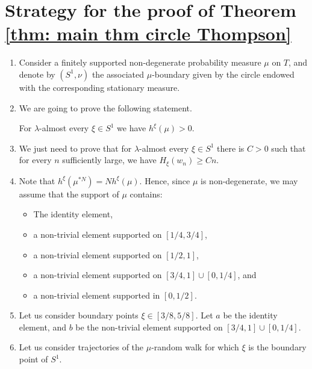 \section{Strategy for the proof of Theorem \ref{thm: main thm circle Thompson}}

\begin{enumerate}
	\item Consider a finitely supported non-degenerate probability measure $\mu$ on $T$, and denote by $(S^1,\nu)$ the associated $\mu$-boundary given by the circle endowed with the corresponding stationary measure.
	\item We are going to prove the following statement.
	\begin{prop}
		For $\lambda$-almost every $\xi \in S^1$ we have $h^{\xi}(\mu)>0$.
	\end{prop}
	\item We just need to prove that for $\lambda$-almost every $\xi \in S^1$ there is $C>0$ such that for every $n$ sufficiently large, we have $H_{\xi}(w_n)\ge Cn$.
	\item Note that $h^{\xi}(\mu^{*N})=Nh^{\xi}(\mu)$. Hence, since $\mu$ is non-degenerate, we may assume that the support of $\mu$ contains:
	\begin{itemize}
		\item The identity element,
		\item a non-trivial element supported on $[1/4,3/4]$,
		\item a non-trivial element supported on $[1/2,1]$,
		\item a non-trivial element supported on $[3/4,1]\cup [0,1/4]$, and
		\item a non-trivial element supported in $[0,1/2]$.
	\end{itemize}
	\item Let us consider boundary points $\xi \in [3/8,5/8]$. Let $a$ be the identity element, and $b$ be the non-trivial element supported on $[3/4,1]\cup [0,1/4]$.
	\item Let us consider trajectories of the $\mu$-random walk for which $\xi$ is the boundary point of $S^1$.
\end{enumerate}